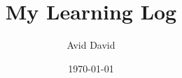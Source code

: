\documentclass[12pt]{article}
\begin{document}
\title{My Learning Log}
\author{Avid David}
\date{\today}
\maketitle

\tableofcontents

\newpage

\end{document}
